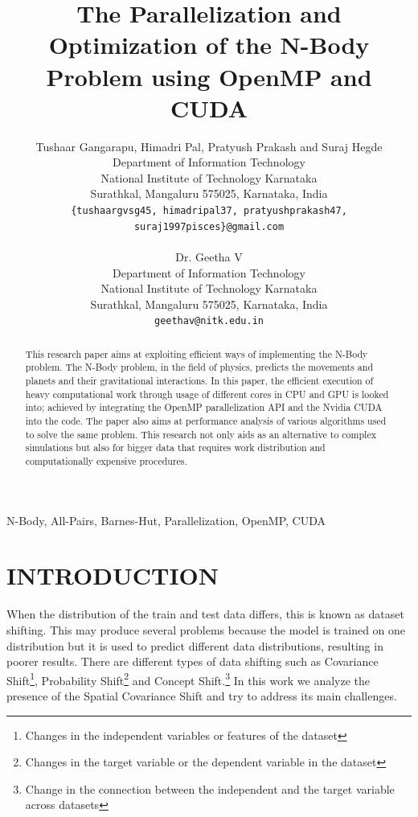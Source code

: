 \documentclass[letterpaper, 10 pt, conference]{ieeeconf}
\title{\LARGE \bf
The Parallelization and Optimization of the N-Body Problem using OpenMP and CUDA
}
\author{Tushaar Gangarapu, Himadri Pal, Pratyush Prakash and Suraj Hegde%
\\ Department of Information Technology \\
National Institute of Technology Karnataka \\
Surathkal, Mangaluru 575025, Karnataka, India \\
{\tt\small\{tushaargvsg45, himadripal37, pratyushprakash47, suraj1997pisces\}@gmail.com} \\ \\
Dr. Geetha V%
\\ Department of Information Technology \\
National Institute of Technology Karnataka \\
Surathkal, Mangaluru 575025, Karnataka, India \\
{\tt\small geethav@nitk.edu.in}
}
\begin{document}
    \maketitle
    \thispagestyle{plain}
    \pagestyle{plain}


    \begin{abstract}

        This research paper aims at exploiting efficient ways of implementing the N-Body problem. The N-Body problem, in the field of physics, predicts the movements and planets and their gravitational interactions. In this paper, the efficient execution of heavy computational work through usage of different cores in CPU and GPU is looked into; achieved by integrating the OpenMP parallelization API and the Nvidia CUDA into the code. The paper also aims at performance analysis of various algorithms used to solve the same problem. This research not only aids as an alternative to complex simulations but also for bigger data that requires work distribution and computationally expensive procedures.\\

    \end{abstract}

    \begin{keywords}

        N-Body, All-Pairs, Barnes-Hut, Parallelization, OpenMP, CUDA

    \end{keywords}


    \section{INTRODUCTION}
    When the distribution of the train and test data differs, this is known as dataset shifting. This may produce several problems because the model is trained on one distribution but it is used to predict different data distributions, resulting in poorer results. There are different types of data shifting such as 
    Covariance Shift\footnote{Changes in the independent variables or features of the dataset},
    Probability Shift\footnote{Changes in the target variable or the dependent variable in the dataset}
    and Concept Shift.\footnote{Change in the connection between the independent and the target variable across datasets}
    In this work we analyze the presence of the Spatial Covariance Shift and try to address its main challenges.
\end{document}
